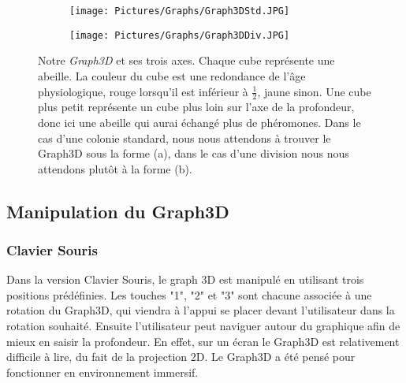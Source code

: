 	\begin{figure}
	\centering
	
	\begin{subfigure}{\textwidth}
	\centering
	\texttt{[image: Pictures/Graphs/Graph3DStd.JPG]}
	\caption{}
	\label{Graph3DStd}	
	\end{subfigure}
	
	\begin{subfigure}{\textwidth}
	\centering
	\texttt{[image: Pictures/Graphs/Graph3DDiv.JPG]}
	\caption{}
	\label{Graph3DDiv}
	\end{subfigure}
	
	\caption[Notre \textit{Graph3D} et ses trois axes.]{Notre \textit{Graph3D} et ses trois axes. Chaque cube représente une abeille. La couleur du cube est une redondance de l'âge physiologique, rouge lorsqu'il est inférieur à $\frac{1}{2}$, jaune sinon. Une cube plus petit représente un cube plus loin sur l'axe de la profondeur, donc ici une abeille qui aurai échangé plus de phéromones. Dans le cas d'une colonie standard, nous nous attendons à trouver le Graph3D sous la forme (a), dans le cas d'une division nous nous attendons plutôt à la forme (b).}	
	\label{Graph3D}
	\end{figure}
	
	\subsection{Manipulation du Graph3D}
	\label{Manip3D}
	
		\subsubsection{Clavier Souris}
		Dans la version Clavier Souris, le graph 3D est manipulé en utilisant trois positions prédéfinies. Les touches "1", "2" et "3" sont chacune associée à une rotation du Graph3D, qui viendra à l'appui se placer devant l'utilisateur dans la rotation souhaité. Ensuite l'utilisateur peut naviguer autour du graphique afin de mieux en saisir la profondeur. En effet, sur un écran le Graph3D est relativement difficile à lire, du fait de la projection 2D. Le Graph3D a été pensé pour fonctionner en environnement immersif.
		
